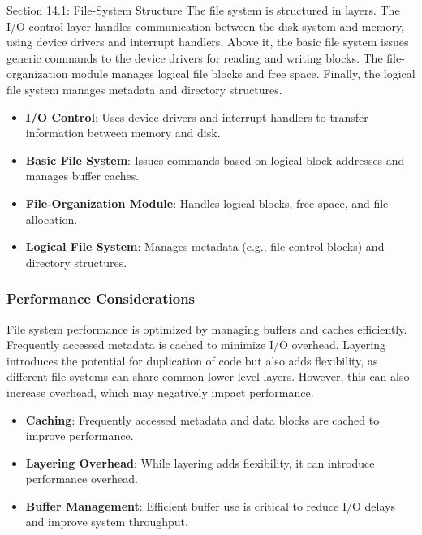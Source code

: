 \begin{notes}{Section 14.1: File-System Structure}
    The file system is structured in layers. The I/O control layer handles communication between the disk system and memory, using device drivers and interrupt handlers. Above it, the basic file system 
    issues generic commands to the device drivers for reading and writing blocks. The file-organization module manages logical file blocks and free space. Finally, the logical file system manages metadata 
    and directory structures.
    
    \begin{highlight}
    
        \begin{itemize}
            \item \textbf{I/O Control}: Uses device drivers and interrupt handlers to transfer information between memory and disk.
            \item \textbf{Basic File System}: Issues commands based on logical block addresses and manages buffer caches.
            \item \textbf{File-Organization Module}: Handles logical blocks, free space, and file allocation.
            \item \textbf{Logical File System}: Manages metadata (e.g., file-control blocks) and directory structures.
        \end{itemize}
    
    \end{highlight}
    
    \subsubsection*{Performance Considerations}
    
    File system performance is optimized by managing buffers and caches efficiently. Frequently accessed metadata is cached to minimize I/O overhead. Layering introduces the potential for duplication 
    of code but also adds flexibility, as different file systems can share common lower-level layers. However, this can also increase overhead, which may negatively impact performance.
    
    \begin{highlight}
    
        \begin{itemize}
            \item \textbf{Caching}: Frequently accessed metadata and data blocks are cached to improve performance.
            \item \textbf{Layering Overhead}: While layering adds flexibility, it can introduce performance overhead.
            \item \textbf{Buffer Management}: Efficient buffer use is critical to reduce I/O delays and improve system throughput.
        \end{itemize}
    

\end{highlight}
\end{notes}
